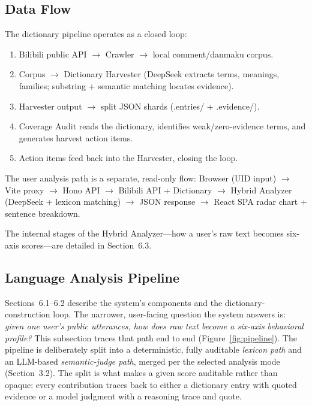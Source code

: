 \documentclass[11pt,a4paper]{article}
\begin{document}
\subsection{Data Flow}

The dictionary pipeline operates as a closed loop:
\begin{enumerate}
  \item Bilibili public API $\rightarrow$ Crawler $\rightarrow$ local comment/danmaku corpus.
  \item Corpus $\rightarrow$ Dictionary Harvester (DeepSeek extracts terms, meanings,
    families; substring + semantic matching locates evidence).
  \item Harvester output $\rightarrow$ split JSON shards (.entries/ + .evidence/).
  \item Coverage Audit reads the dictionary, identifies weak/zero-evidence terms, and
    generates harvest action items.
  \item Action items feed back into the Harvester, closing the loop.
\end{enumerate}

The user analysis path is a separate, read-only flow:
Browser (UID input) $\rightarrow$ Vite proxy $\rightarrow$ Hono API $\rightarrow$
Bilibili API + Dictionary $\rightarrow$ Hybrid Analyzer (DeepSeek + lexicon matching)
$\rightarrow$ JSON response $\rightarrow$ React SPA radar chart + sentence breakdown.

The internal stages of the Hybrid Analyzer---how a user's raw text becomes six-axis
scores---are detailed in Section~6.3.

\subsection{Language Analysis Pipeline}
\label{subsec:pipeline}

Sections~6.1--6.2 describe the system's components and the dictionary-construction loop.
The narrower, user-facing question the system answers is: \emph{given one user's public
utterances, how does raw text become a six-axis behavioral profile?} This subsection traces
that path end to end (Figure~\ref{fig:pipeline}). The pipeline is deliberately split into a
deterministic, fully auditable \emph{lexicon path} and an LLM-based \emph{semantic-judge
path}, merged per the selected analysis mode (Section~3.2). The split is what makes a given
score auditable rather than opaque: every contribution traces back to either a dictionary
entry with quoted evidence or a model judgment with a reasoning trace and quote.
\end{document}
